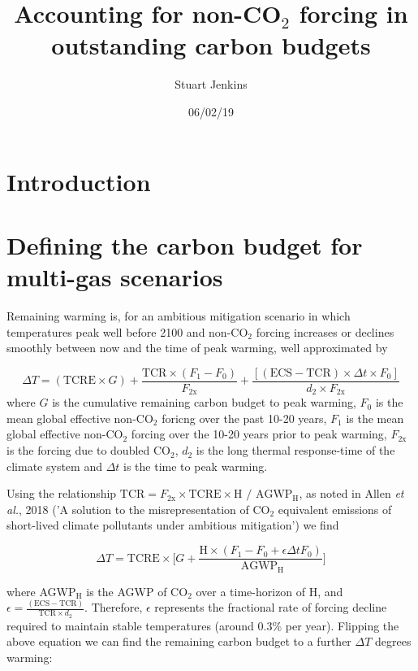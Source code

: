 \documentclass[11pt]{article}
\begin{document}
\title{Accounting for non-CO$_2$ forcing in outstanding carbon budgets}
\author{Stuart Jenkins}
\date{06/02/19}
\maketitle

\section{Introduction}

\section{Defining the carbon budget for multi-gas scenarios}

Remaining warming is, for an ambitious mitigation scenario in which temperatures peak well before 2100 and non-CO$_2$ forcing increases or declines smoothly between now and the time of peak warming, well approximated by

\begin{equation}
    \Delta T = (\text{TCRE} \times G) + \frac{\text{TCR} \times (F_1 - F_0)}{F_{2\text{x}}} + \frac{[(\text{ECS}-\text{TCR})\times\Delta t \times F_0]}{d_2 \times F_{2\text{x}}}
\end{equation}
where $G$ is the cumulative remaining carbon budget to peak warming, $F_0$
is the mean global effective non-CO$_2$ foricng over the past 10-20 years, $F_1$ is the mean global effective non-CO$_2$ forcing over the 10-20 years prior to peak warming, $F_{2\text{x}}$ is the forcing due to doubled CO$_2$, $d_2$ is the long thermal response-time of the climate system and $\Delta t$ is the time to peak warming. 

Using the relationship $\text{TCR} = F_{2\text{x}} \times \text{TCRE} \times \text{H } / \text{ AGWP}_\text{H}$, as noted in Allen \textit{et al.}, 2018 ('A solution to the misrepresentation of CO$_2$ equivalent emissions of short-lived climate pollutants under ambitious mitigation') we find

\begin{equation}
    \Delta T = \text{TCRE} \times \Big[G + \frac{\text{H}\times(F_1 - F_0 + \epsilon\Delta t F_0)}{\text{ AGWP}_\text{H}}\Big]
\end{equation}

where AGWP$_\text{H}$ is the AGWP of CO$_2$ over a time-horizon of H, and $\epsilon = \frac{(\text{ECS}-\text{TCR})}{\text{TCR} \times d_2}$. Therefore, $\epsilon$ represents the fractional rate of forcing decline required to maintain stable temperatures (around 0.3\% per year). Flipping the above equation we can find the remaining carbon budget to a further $\Delta T$ degrees warming:
\end{document}
